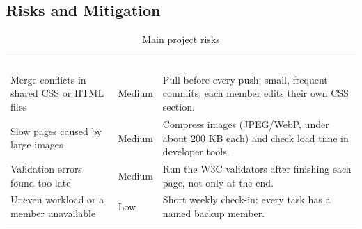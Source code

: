 \documentclass[10pt,a4paper]{article}
\newcommand{\hc}[1]{\textcolor{white}{\bfseries #1}}
\newcommand{\tbl}{\rowcolors{2}{white}{gkbg}\renewcommand{\arraystretch}{1.2}\footnotesize}
\begin{document}
\subsection{Risks and Mitigation}
\begin{table}[H]
\centering
\caption{Main project risks}
\tbl
\begin{tabularx}{\textwidth}{@{}YlY@{}}
\hc{Risk} & \hc{Level} & \hc{Mitigation}\\
Merge conflicts in shared CSS or HTML files & Medium & Pull before every push; small, frequent commits; each member edits their own CSS section.\\
Slow pages caused by large images & Medium & Compress images (JPEG/WebP, under about 200 KB each) and check load time in developer tools.\\
Validation errors found too late & Medium & Run the W3C validators after finishing each page, not only at the end.\\
Uneven workload or a member unavailable & Low & Short weekly check-in; every task has a named backup member.\\
\end{tabularx}
\end{table}
\end{document}
